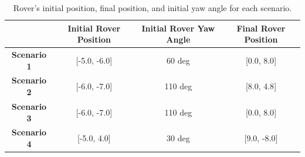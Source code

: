 \documentclass{article}
\begin{document}
\begin{table}[]
	\centering
	\begin{tabular}{|c|c|c|c|}
		\hline
		& \textbf{Initial Rover Position} & \textbf{Initial Rover Yaw Angle} & \textbf{Final Rover Position} \\ \hline
		\textbf{Scenario 1} & {[}-5.0, -6.0{]}                & 60 deg                           & {[}0.0, 8.0{]}                \\ \hline
		\textbf{Scenario 2} & {[}-6.0, -7.0{]}                & 110 deg                          & {[}8.0, 4.8{]}                \\ \hline
		\textbf{Scenario 3} & {[}-6.0, -7.0{]}                & 110 deg                          & {[}0.0, 8.0{]}                \\ \hline
		\textbf{Scenario 4} & {[}-5.0, 4.0{]}                 & 30 deg                           & {[}9.0, -8.0{]}               \\ \hline
	\end{tabular}
	\caption{Rover's initial position, final position, and initial yaw angle for each scenario.}
	\label{tab:sce_setup}
\end{table}
\end{document}
